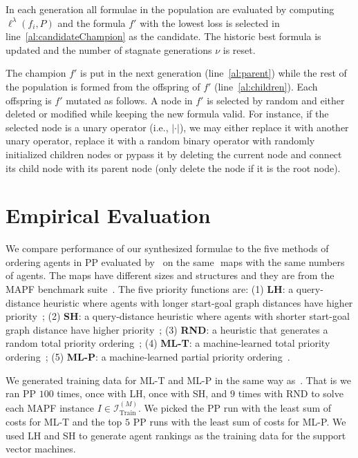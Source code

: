 In each generation all formulae in the population are evaluated by computing $ \ell^{\lambda}(f_i, P) $ and the formula $ f' $ with the lowest loss is selected in line~\ref{al:candidateChampion} as the candidate. The historic best formula is updated and the number of stagnate generations $ \nu $ is reset.

The champion $ f' $ is put in the next generation (line~\ref{al:parent}) while the rest of the population is formed from the offspring of $ f' $ (line~\ref{al:children}). Each offspring is $ f' $ mutated as follows. A node in $ f' $ is selected by random and either deleted or modified while keeping the new formula valid. For instance, if the selected node is a unary operator (i.e., $ |\cdot| $), we may either replace it with another unary operator, replace it with a random binary operator with randomly initialized children nodes or pypass it by deleting the current node and connect its child node with its parent node (only delete the node if it is the root node).

\section{Empirical Evaluation}
\label{sec:empiricalEvaluation}

We compare performance of our synthesized formulae to the five methods of ordering agents in PP evaluated by~\citet{zhang2022learning} on the same $  $ maps with the same numbers of agents. The maps have different sizes and structures and they are from the MAPF benchmark suite~\citep{stern2019multi}. The five priority functions are: (1) \textbf{LH}: a query-distance heuristic where agents with longer start-goal graph distances have higher priority~\citep{van2005prioritized}; (2) \textbf{SH}: a query-distance heuristic where agents with shorter start-goal graph distance have higher priority~\citep{ma2019searching}; (3) \textbf{RND}: a heuristic that generates a random total priority ordering~\citep{bennewitz2002finding}; (4) \textbf{ML-T}: a machine-learned total priority ordering~\citep{zhang2022learning}; (5) \textbf{ML-P}: a machine-learned partial priority ordering~\citep{zhang2022learning}.

We generated training data for ML-T and ML-P in the same way as~\citet{zhang2022learning}. That is we ran PP $ 100 $ times, once with LH, once with SH, and $ 9 $ times with RND to solve each MAPF instance $ I \in \mathcal{I}^{(M)}_{\text{Train}} $. We picked the PP run with the least sum of costs for ML-T and the top $ 5 $ PP runs with the least sum of costs for ML-P. We used LH and SH to generate agent rankings as the training data for the support vector machines.

